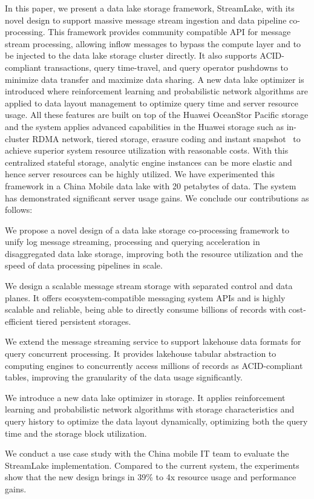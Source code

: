 In this paper, we present a data lake storage framework, StreamLake, with its novel design to support massive message stream ingestion and data pipeline co-processing. This framework provides community compatible API for message stream processing, allowing inflow messages to bypass the compute layer and to be injected to the data lake storage cluster directly. It also supports ACID-compliant transactions, query time-travel, and query operator pushdowns to minimize data transfer and maximize data sharing. A new data lake optimizer is introduced where reinforcement learning and probabilistic network algorithms are applied to data layout management to optimize query time and server resource usage. All these features are built on top of the Huawei OceanStor Pacific storage and the system applies advanced capabilities in the Huawei storage such as in-cluster RDMA network, tiered storage, erasure coding and instant snapshot~\cite{} to achieve superior system resource utilization with reasonable costs. With this centralized stateful storage, analytic engine instances can be more elastic and hence server resources can be highly utilized. We have experimented this framework in a China Mobile data lake with 20 petabytes of data. The system has demonstrated significant server usage gains. We conclude our contributions as follows:

We propose a novel design of a data lake storage co-processing framework to unify log message streaming, processing and querying acceleration in disaggregated data lake storage, improving both the resource utilization and the speed of data processing pipelines in scale.


We design a scalable message stream storage with separated control and data planes. It offers ecosystem-compatible messaging system APIs and is highly scalable and reliable, being able to directly consume billions of records with cost-efficient tiered persistent storages. 


We extend the message streaming service to support lakehouse data formats for query concurrent processing. It provides lakehouse tabular abstraction to computing engines to concurrently access millions of records as ACID-compliant tables, improving the granularity of the data usage significantly.


We introduce a new data lake optimizer in storage. It applies reinforcement learning and probabilistic network algorithms with storage characteristics and query history to optimize the data layout dynamically, optimizing both the query time and the storage block utilization.

We conduct a use case study with the China mobile IT team to evaluate the StreamLake implementation. Compared to the current system, the experiments show that the new design brings in 39\% to 4x resource usage and performance gains.

\fi

